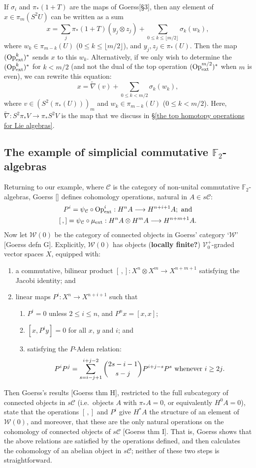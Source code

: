 \documentclass[11pt]{amsart}
\theoremstyle{plain}
\theoremstyle{definition}
\renewcommand{\to}{\longrightarrow}
\newcommand{\calW}{\mathcal{W}}
\newcommand{\calC}{\mathcal{C}}
\newcommand{\calV}{\mathcal{V}}
\theoremstyle{plain}
\newcommand{\vect}[2]{\calV^{#1}_{#2}}
\newcommand{\ExtCohOp}{\textup{Op}_\textup{ext}}
\newcommand{\ExtCohProd}{\mu_\textup{ext}}
\newcommand{\F}{\mathbb{F}}
\begin{document}
\begin{Conventions and notation}
If $\sigma_i$ and $\pi_*(1+T)$ are the maps of Goerss[\S3], then any element of $x\in \pi_m(S^2U)$ can be written as a sum
\[x=\sum_j\pi_*(1+T)(y_j\otimes z_j)+\sum_{0\leq k\leq \lfloor m/2\rfloor}\sigma_k(w_k),\]
where $w_k\in \pi_{m-k}(U)$ ($0\leq k\leq\lfloor m/2\rfloor$), and $y_j,z_j\in \pi_{*}(U)$.
Then the map $(\ExtCohOp^k)^*$ sends $x$ to this $w_k$. Alternatively, if we only wish to determine the $(\ExtCohOp^k)^*$ for $k<m/2$ (and not the dual of the top operation $(\ExtCohOp^{m/2})^*$ when $m$ is even), we can rewrite this equation: 
\[x=\widetilde{\nabla}(v)+\sum_{0\leq k< m/2}\sigma_k(w_k),\]
where $v\in(S^2(\pi_*(U)))_{m}$ and $w_k\in \pi_{m-k}(U)$ ($0\leq k<m/2$). Here, $\widetilde{\nabla}:S^2\pi_*V\to \pi_*S^2V$ is the map that we discuss in \S\ref{the top homotopy operations for Lie algebras}.




\subsection{The example of simplicial commutative $\F_2$-algebras}\label{The example of simplicial commutative F2-algebras}
Returning to our example, where $\calC$ is the category of non-unital commutative $\F_2$-algebras, Goerss [] defines cohomology operations, natural in $A\in s\calC$:
\begin{gather*}
P^i=\psi_\calC\circ\ExtCohOp^i:H^nA\to H^{n+i+1}A;\textup{ and}\\
[\,,]=\psi_\calC\circ\ExtCohProd :H^nA\otimes H^mA\to H^{n+m+1}A.
\end{gather*}
Now let $\calW(0)$ be the category of connected objects in Goerss' category `$\calW$' [Goerss defn G]. Explicitly, $\calW(0)$ has objects (\textbf{locally finite?}) $\vect{+}{0}$-graded vector spaces $X$, equipped with:
\begin{enumerate}
\item a commutative, bilinear product $[\,,]:X^n\otimes X^m\to X^{n+m+1}$ satisfying the Jacobi identity; and
\item linear maps $P^i:X^n\to X^{n+i+1}$ such that
\begin{enumerate}
\item $P^i=0$ unless $2\leq i\leq n$, and $P^nx=[x,x]$;
\item $[x,P^iy]=0$ for all $x$, $y$ and $i$; and
\item satisfying the $P$-Adem relation:
\[P^iP^j=\sum_{s=i-j+1}^{i+j-2}{2s-i-1\choose s-j}P^{i+j-s}P^s\textup{ whenever $i\geq 2j$.}\]
\end{enumerate}
\end{enumerate}
Then Goerss's results [Goerss thm H], restricted to the full subcategory of connected objects in $s\calC$ (i.e.\ objects $A$ with $\pi_*A=0$, or equivalently $H^0A=0$), state that the operations $[\,,]$ and $P^i$ give $H^*A$ the structure of an element of $\calW(0)$, and moreover, that these are the only natural operations on the cohomology of connected objects of $s\calC$ [Goerss thm I]. That is, Goerss shows that the above relations are satisfied by the operations defined, and then calculates the cohomology of an abelian object in $s\calC$; neither of these two steps is straightforward.


\end{Conventions and notation}
\end{document}
